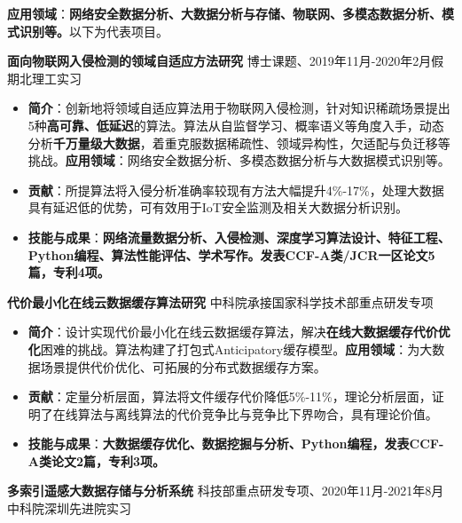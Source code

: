\documentclass[UTF8,letterpaper,11pt]{article}
\begin{document}
\vspace{2mm}

\textbf{应用领域}：\textbf{网络安全数据分析、大数据分析与存储、物联网、多模态数据分析、模式识别等。}以下为代表项目。

\vspace{2mm}

\textbf{面向物联网入侵检测的领域自适应方法研究} \hfill 博士课题、2019年11月-2020年2月假期北理工实习

\begin{itemize}
  \setlength\itemsep{2.0pt}
  \item \textbf{简介}：创新地将领域自适应算法用于物联网入侵检测，针对知识稀疏场景提出5种\textbf{高可靠、低延迟}的算法。算法从自监督学习、概率语义等角度入手，动态分析\textbf{千万量级大数据}，着重克服数据稀疏性、领域异构性，欠适配与负迁移等挑战。\textbf{应用领域}：网络安全数据分析、多模态数据分析与大数据模式识别等。
  \item \textbf{贡献}：所提算法将入侵分析准确率较现有方法大幅提升4\%-17\%，处理大数据具有延迟低的优势，可有效用于IoT安全监测及相关大数据分析识别。
  \item \textbf{技能与成果}：\textbf{网络流量数据分析、入侵检测、深度学习算法设计、特征工程、Python编程、算法性能评估、学术写作。发表CCF-A类/JCR一区论文5篇，专利4项。}
\end{itemize}

\vspace{1pt}

\textbf{代价最小化在线云数据缓存算法研究} \hfill 中科院承接国家科学技术部重点研发专项

\begin{itemize}
  \setlength\itemsep{2.0pt}
  \item \textbf{简介}：设计实现代价最小化在线云数据缓存算法，解决\textbf{在线大数据缓存代价优化}困难的挑战。算法构建了打包式Anticipatory缓存模型。\textbf{应用领域}：为大数据场景提供代价优化、可拓展的分布式数据缓存方案。
  \item \textbf{贡献}：定量分析层面，算法将文件缓存代价降低5\%-11\%，理论分析层面，证明了在线算法与离线算法的代价竞争比与竞争比下界吻合，具有理论价值。
  \item \textbf{技能与成果}：\textbf{大数据缓存优化、数据挖掘与分析、Python编程，发表CCF-A类论文2篇，专利3项。}
\end{itemize}

\vspace{1pt}

\textbf{多索引遥感大数据存储与分析系统} \hfill 科技部重点研发专项、2020年11月-2021年8月中科院深圳先进院实习
\end{document}
